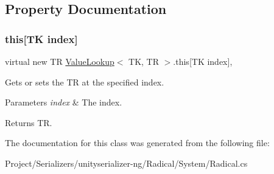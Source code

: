 \subsection{Property Documentation}
\mbox{\label{class_value_lookup_ab97673769de1de0b42b7f7afa235981f}} 
\subsubsection{\texorpdfstring{this[T\+K index]}{this[TK index]}}
{\footnotesize\ttfamily virtual new TR \hyperlink{class_value_lookup}{Value\+Lookup}$<$ TK, TR $>$.this\mbox{[}TK index\mbox{]}\hspace{0.3cm}{\ttfamily [get]}, {\ttfamily [set]}}



Gets or sets the TR at the specified index. 


\begin{DoxyParams}{Parameters}
{\em index} & The index.\\
\hline
\end{DoxyParams}
\begin{DoxyReturn}{Returns}
TR.
\end{DoxyReturn}


The documentation for this class was generated from the following file\+:\begin{DoxyCompactItemize}
\item 
Project/\+Serializers/unityserializer-\/ng/\+Radical/\+System/Radical.\+cs\end{DoxyCompactItemize}
